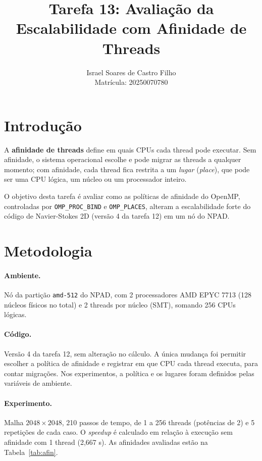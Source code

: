 \documentclass[a4paper,12pt]{article}
\title{Tarefa 13: Avaliação da Escalabilidade com Afinidade de Threads}
\author{Israel Soares de Castro Filho \\ Matrícula: 20250070780}
\date{}
\begin{document}
\maketitle

\section{Introdução}

A \textbf{afinidade de threads} define em quais CPUs cada thread pode executar. Sem afinidade, o sistema operacional escolhe e pode migrar as threads a qualquer momento; com afinidade, cada thread fica restrita a um \emph{lugar} (\emph{place}), que pode ser uma CPU lógica, um núcleo ou um processador inteiro.

O objetivo desta tarefa é avaliar como as políticas de afinidade do OpenMP, controladas por \texttt{OMP\_PROC\_BIND} e \texttt{OMP\_PLACES}, alteram a escalabilidade forte do código de Navier-Stokes 2D (versão 4 da tarefa 12) em um nó do NPAD.

\section{Metodologia}

\paragraph{Ambiente.} Nó da partição \texttt{amd-512} do NPAD, com 2 processadores AMD EPYC 7713 (128 núcleos físicos no total) e 2 threads por núcleo (SMT), somando 256 CPUs lógicas.

\paragraph{Código.} Versão 4 da tarefa 12, sem alteração no cálculo. A única mudança foi permitir escolher a política de afinidade e registrar em que CPU cada thread executa, para contar migrações. Nos experimentos, a política e os lugares foram definidos pelas variáveis de ambiente.

\paragraph{Experimento.} Malha $2048\times2048$, 210 passos de tempo, de 1 a 256 threads (potências de 2) e 5 repetições de cada caso. O \emph{speedup} é calculado em relação à execução sem afinidade com 1 thread (2,667 s). As afinidades avaliadas estão na Tabela~\ref{tab:afin}.
\end{document}
